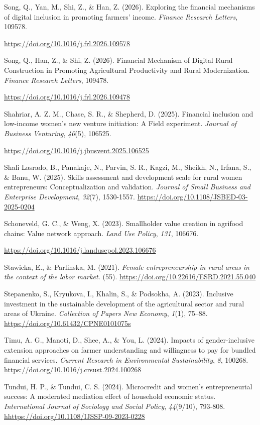 \documentclass[
]{article}
\begin{document}
Song, Q., Yan, M., Shi, Z., \& Han, Z. (2026). Exploring the financial
mechanisms of digital inclusion in promoting farmers' income.
\emph{Finance Research Letters}, 109578.

\url{https://doi.org/10.1016/j.frl.2026.109578}

Song, Q., Han, Z., \& Shi, Z. (2026). Financial Mechanism of Digital
Rural Construction in Promoting Agricultural Productivity and Rural
Modernization. \emph{Finance Research Letters}, 109478.

\url{https://doi.org/10.1016/j.frl.2026.109478}

Shahriar, A. Z. M., Chase, S. R., \& Shepherd, D. (2025). Financial
inclusion and low-income women's new venture initiation: A Field
experiment. \emph{Journal of Business Venturing}, \emph{40}(5), 106525.

\url{https://doi.org/10.1016/j.jbusvent.2025.106525}

Shali Lasrado, B., Panakaje, N., Parvin, S. R., Kagzi, M., Sheikh, N.,
Irfana, S., \& Banu, W. (2025). Skills assessment and development scale
for rural women entrepreneurs: Conceptualization and validation.
\emph{Journal of Small Business and Enterprise Development},
\emph{32}(7), 1530-1557.
\url{https://doi.org/10.1108/JSBED-03-2025-0204}

Schoneveld, G. C., \& Weng, X. (2023). Smallholder value creation in
agrifood chains: Value network approach. \emph{Land Use Policy},
\emph{131}, 106676.

\url{https://doi.org/10.1016/j.landusepol.2023.106676}

Stawicka, E., \& Parlinska, M. (2021). \emph{Female entrepreneurship in
rural areas in the context of the labor market.} (55).
\url{https://doi.org/10.22616/ESRD.2021.55.040}

Stepanenko, S., Kryukova, I., Khalin, S., \& Podsokha, A. (2023).
Inclusive investment in the sustainable development of the agricultural
sector and rural areas of Ukraine. \emph{Collection of Papers New
Economy}, \emph{1}(1), 75--88.
\url{https://doi.org/10.61432/CPNE0101075s}

Timu, A. G., Manoti, D., Shee, A., \& You, L. (2024). Impacts of
gender-inclusive extension approaches on farmer understanding and
willingness to pay for bundled financial services. \emph{Current
Research in Environmental Sustainability}, \emph{8}, 100268.
\url{https://doi.org/10.1016/j.crsust.2024.100268}

Tundui, H. P., \& Tundui, C. S. (2024). Microcredit and women's
entrepreneurial success: A moderated mediation effect of household
economic status. \emph{International Journal of Sociology and Social
Policy}, \emph{44}(9/10), 793-808.
\href{https://doi.org/10.1108/IJSSP-09-2023-0228}{hhttps://doi.org/10.1108/IJSSP-09-2023-0228}
\end{document}

